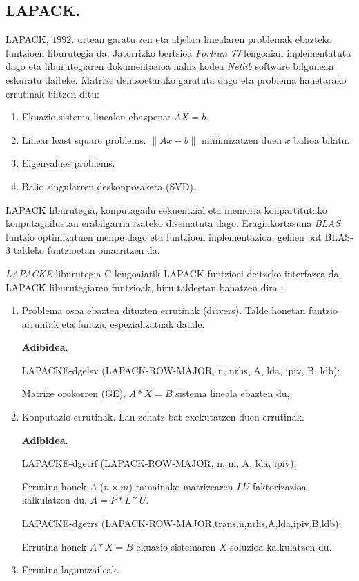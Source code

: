 \subsection*{LAPACK.}


\href{http://www.netlib.org/lapack/}{LAPACK}, $1992.$ urtean garatu zen \cite{Anderson1999,Higham2002} eta aljebra linealaren problemak ebazteko funtzioen liburutegia da. Jatorrizko bertsioa \emph{Fortran 77} lengoaian inplementatuta dago eta liburutegiaren dokumentazioa nahiz kodea \emph{Netlib} software bilgunean eskuratu daiteke. Matrize dentsoetarako garatuta dago eta problema hauetarako errutinak biltzen ditu: 
\begin{enumerate}
\item Ekuazio-sistema linealen ebazpena: $AX=b$.
\item Linear least square problems: $\|Ax-b\|$ minimizatzen duen $x$ balioa bilatu.
\item Eigenvalues problems.
\item Balio singularren deskonposaketa (SVD).
\end{enumerate}

LAPACK liburutegia, konputagailu sekuentzial eta memoria konpartitutako konputagailuetan erabilgarria izateko diseinatuta dago. Eraginkortasuna \emph{BLAS} funtzio optimizatuen menpe dago eta funtzioen inplementazioa, gehien bat BLAS-3 taldeko funtzioetan oinarritzen da. 

\emph{LAPACKE} liburutegia C-lengoaiatik LAPACK funtzioei deitzeko interfazea da. LAPACK liburutegiaren funtzioak, hiru taldeetan banatzen dira \cite{Anderson1999,Intel2015}:
\begin{enumerate}
\item Problema osoa ebazten dituzten errutinak (drivers). Talde honetan funtzio arruntak eta funtzio espezializatuak daude.

\textbf{Adibidea}.

LAPACKE-dgelsv (LAPACK-ROW-MAJOR, n, nrhs, A, lda, ipiv, B, ldb);

Matrize orokorren (GE), $A * X = B$ sistema lineala ebazten du,


\item Konputazio errutinak. Lan zehatz bat exekutatzen duen errutinak.

\textbf{Adibidea}.

LAPACKE-dgetrf (LAPACK-ROW-MAJOR, n, m, A, lda, ipiv);

Errutina honek $A$ ($n \times m$) tamainako matrizearen $LU$ faktorizazioa kalkulatzen du, $A=P*L*U$.

LAPACKE-dgetrs (LAPACK-ROW-MAJOR,trans,n,nrhs,A,lda,ipiv,B,ldb);

Errutina honek $A*X=B$ ekuazio sistemaren $X$ soluzioa kalkulatzen du.
   

\item Errutina laguntzaileak.
\end{enumerate}


